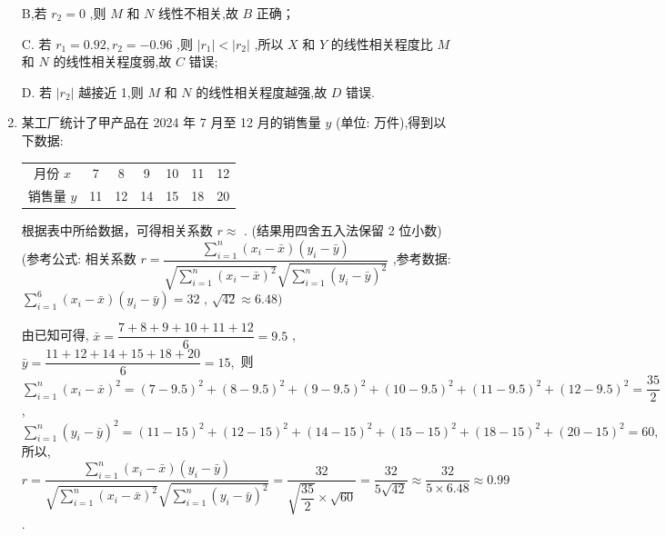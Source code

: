 \begin{enumerate}
\begin{jieda}
        B,若 ${r}_{2} = 0$ ,则 $M$ 和 $N$ 线性不相关,故 ${B}$ 正确；
        
        C. 若 ${r}_{1} = {0.92},{r}_{2} =  - {0.96}$ ,则 $\left| {r}_{1}\right|  < \left| {r}_{2}\right|$ ,所以 $X$ 和 $Y$ 的线性相关程度比 $M$ 和 $N$ 的线性相关程度弱,故 ${C}$ 错误;
        
        D. 若 $\left| {r}_{2}\right|$ 越接近 1,则 $M$ 和 $N$ 的线性相关程度越强,故 ${D}$ 错误.
    \end{jieda}
    
    \item 某工厂统计了甲产品在 2024 年 7 月至 12 月的销售量 $y$ (单位: 万件),得到以下数据:
    
    \begin{center}
    \begin{tabular}{|c|c|c|c|c|c|c|}
    \hline
    月份 $x$ & 7 & 8 & 9 & 10 & 11 & 12 \\
    \cline{1-7}
    销售量 $y$ & 11 & 12 & 14 & 15 & 18 & 20 \\
    \cline{1-7}
    \hline
    \end{tabular}
    \end{center}
    
    根据表中所给数据，可得相关系数 $r \approx$ . (结果用四舍五入法保留 2 位小数) (参考公式: 相关系数 $r = \dfrac{\mathop{\sum }\limits_{{i = 1}}^{n}\left( {{x}_{i} - \bar{x}}\right) \left( {{y}_{i} - \bar{y}}\right) }{\sqrt{\mathop{\sum }\limits_{{i = 1}}^{n}{\left( {x}_{i} - \bar{x}\right) }^{2}}\sqrt{\mathop{\sum }\limits_{{i = 1}}^{n}{\left( {y}_{i} - \bar{y}\right) }^{2}}}$ ,参考数据: $\mathop{\sum }\limits_{{i = 1}}^{6}\left( {{x}_{i} - \bar{x}}\right) \left( {{y}_{i} - \bar{y}}\right)  = {32}$ , $\sqrt{42} \approx  {6.48})$
    \begin{jieda}
        由已知可得, $\bar{x} = \dfrac{7 + 8 + 9 + {10} + {11} + {12}}{6} = {9.5}$ ,
        $\bar{y} = \dfrac{{11} + {12} + {14} + {15} + {18} + {20}}{6} = {15},$
        则 $\mathop{\sum }\limits_{{i = 1}}^{n}{\left( {x}_{i} - \bar{x}\right) }^{2} = {\left( 7 - {9.5}\right) }^{2} + {\left( 8 - {9.5}\right) }^{2} + {\left( 9 - {9.5}\right) }^{2} + {\left( {10} - {9.5}\right) }^{2} + {\left( {11} - {9.5}\right) }^{2} + {\left( {12} - {9.5}\right) }^{2} = \dfrac{35}{2}$ ,
        $\mathop{\sum }\limits_{{i = 1}}^{n}{\left( {y}_{i} - \bar{y}\right) }^{2} = {\left( {11} - {15}\right) }^{2} + {\left( {12} - {15}\right) }^{2} + {\left( {14} - {15}\right) }^{2} + {\left( {15} - {15}\right) }^{2} + {\left( {18} - {15}\right) }^{2} + {\left( {20} - {15}\right) }^{2} = {60},$
        所以, $r = \dfrac{\mathop{\sum }\limits_{{i = 1}}^{n}\left( {{x}_{i} - \bar{x}}\right) \left( {{y}_{i} - \bar{y}}\right) }{\sqrt{\mathop{\sum }\limits_{{i = 1}}^{n}{\left( {x}_{i} - \bar{x}\right) }^{2}}\sqrt{\mathop{\sum }\limits_{{i = 1}}^{n}{\left( {y}_{i} - \bar{y}\right) }^{2}}} = \dfrac{32}{\sqrt{\dfrac{35}{2}} \times  \sqrt{60}} = \dfrac{32}{5\sqrt{42}} \approx  \dfrac{32}{5 \times  {6.48}} \approx  {0.99}$ .
    \end{jieda}


\end{enumerate}
